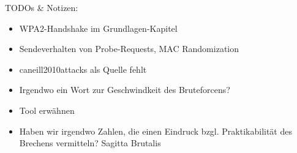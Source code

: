TODOs \& Notizen:
\begin{itemize}
	\item WPA2-Handshake im Grundlagen-Kapitel
	\item Sendeverhalten von Probe-Requests, MAC Randomization
	\item caneill2010attacks als Quelle fehlt
	\item Irgendwo ein Wort zur Geschwindkeit des Bruteforcens?
	\item Tool erwähnen
	\item Haben wir irgendwo Zahlen, die einen Eindruck bzgl. Praktikabilität des Brechens vermitteln? Sagitta Brutalis
\end{itemize}